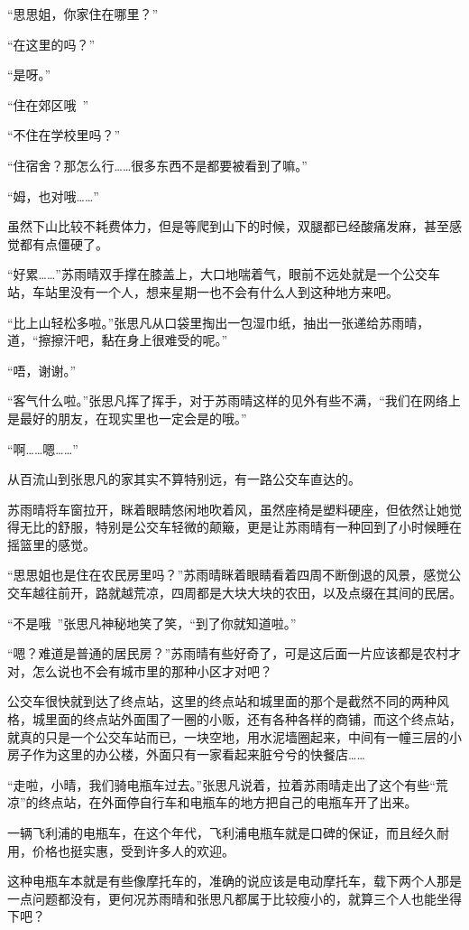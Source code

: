 “思思姐，你家住在哪里？”

“在这里的吗？”

“是呀。”

“住在郊区哦~”

“不住在学校里吗？”

“住宿舍？那怎么行……很多东西不是都要被看到了嘛。”

“姆，也对哦……”

虽然下山比较不耗费体力，但是等爬到山下的时候，双腿都已经酸痛发麻，甚至感觉都有点僵硬了。

“好累……”苏雨晴双手撑在膝盖上，大口地喘着气，眼前不远处就是一个公交车站，车站里没有一个人，想来星期一也不会有什么人到这种地方来吧。

“比上山轻松多啦。”张思凡从口袋里掏出一包湿巾纸，抽出一张递给苏雨晴，道，“擦擦汗吧，黏在身上很难受的呢。”

“唔，谢谢。”

“客气什么啦。”张思凡挥了挥手，对于苏雨晴这样的见外有些不满，“我们在网络上是最好的朋友，在现实里也一定会是的哦。”

“啊……嗯……”

从百流山到张思凡的家其实不算特别远，有一路公交车直达的。

苏雨晴将车窗拉开，眯着眼睛悠闲地吹着风，虽然座椅是塑料硬座，但依然让她觉得无比的舒服，特别是公交车轻微的颠簸，更是让苏雨晴有一种回到了小时候睡在摇篮里的感觉。

“思思姐也是住在农民房里吗？”苏雨晴眯着眼睛看着四周不断倒退的风景，感觉公交车越往前开，路就越荒凉，四周都是大块大块的农田，以及点缀在其间的民居。

“不是哦~”张思凡神秘地笑了笑，“到了你就知道啦。”

“嗯？难道是普通的居民房？”苏雨晴有些好奇了，可是这后面一片应该都是农村才对，怎么说也不会有城市里的那种小区才对吧？

公交车很快就到达了终点站，这里的终点站和城里面的那个是截然不同的两种风格，城里面的终点站外面围了一圈的小贩，还有各种各样的商铺，而这个终点站，就真的只是一个公交车站而已，一块空地，用水泥墙圈起来，中间有一幢三层的小房子作为这里的办公楼，外面只有一家看起来脏兮兮的快餐店……

“走啦，小晴，我们骑电瓶车过去。”张思凡说着，拉着苏雨晴走出了这个有些“荒凉”的终点站，在外面停自行车和电瓶车的地方把自己的电瓶车开了出来。

一辆飞利浦的电瓶车，在这个年代，飞利浦电瓶车就是口碑的保证，而且经久耐用，价格也挺实惠，受到许多人的欢迎。

这种电瓶车本就是有些像摩托车的，准确的说应该是电动摩托车，载下两个人那是一点问题都没有，更何况苏雨晴和张思凡都属于比较瘦小的，就算三个人也能坐得下吧？

